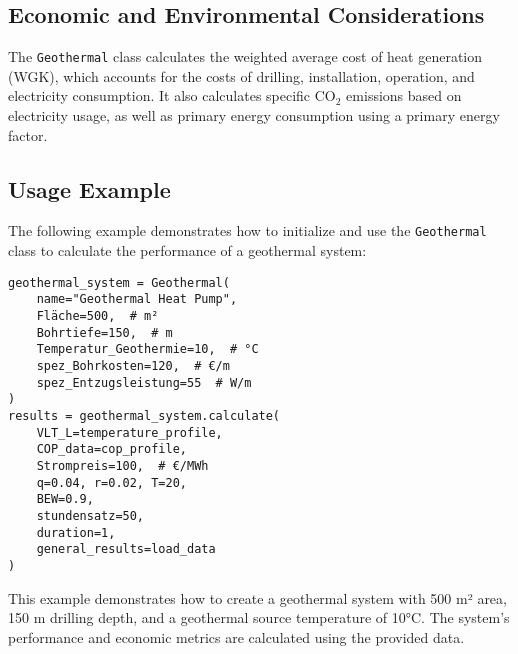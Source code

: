 \subsection{Economic and Environmental Considerations}
The \texttt{Geothermal} class calculates the weighted average cost of heat generation (WGK), which accounts for the costs of drilling, installation, operation, and electricity consumption. It also calculates specific CO$_2$ emissions based on electricity usage, as well as primary energy consumption using a primary energy factor.

\subsection{Usage Example}
The following example demonstrates how to initialize and use the \texttt{Geothermal} class to calculate the performance of a geothermal system:

\begin{verbatim}
geothermal_system = Geothermal(
    name="Geothermal Heat Pump",
    Fläche=500,  # m²
    Bohrtiefe=150,  # m
    Temperatur_Geothermie=10,  # °C
    spez_Bohrkosten=120,  # €/m
    spez_Entzugsleistung=55  # W/m
)
results = geothermal_system.calculate(
    VLT_L=temperature_profile, 
    COP_data=cop_profile, 
    Strompreis=100,  # €/MWh
    q=0.04, r=0.02, T=20, 
    BEW=0.9, 
    stundensatz=50, 
    duration=1, 
    general_results=load_data
)
\end{verbatim}
This example demonstrates how to create a geothermal system with 500 m² area, 150 m drilling depth, and a geothermal source temperature of 10°C. The system's performance and economic metrics are calculated using the provided data.
